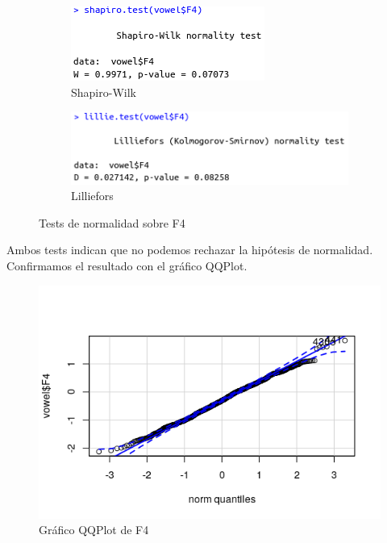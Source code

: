 \begin{figure}[H]
	\centering
	\begin{subfigure}{.5\textwidth}
		\centering
		\includegraphics[width=.7\linewidth]{sw-F4.png}
		\caption{Shapiro-Wilk}
		\label{fig:sw-F4}
	\end{subfigure}%
	\begin{subfigure}{.5\textwidth}
		\centering
		\includegraphics[width=.8\linewidth]{l-F4.png}
		\caption{Lilliefors}
		\label{fig:l-F4}
	\end{subfigure}
	\caption{Tests de normalidad sobre F4}
	\label{fig:normF4}
\end{figure}

Ambos tests indican que no podemos rechazar la hipótesis de normalidad. Confirmamos el resultado con el gráfico QQPlot.

\begin{figure}[H] %
	\centering
	\includegraphics[scale=0.6]{qq-F4.png}  %
	\caption{Gráfico QQPlot de F4} 
	\label{fig:qq-F4}
\end{figure} 

